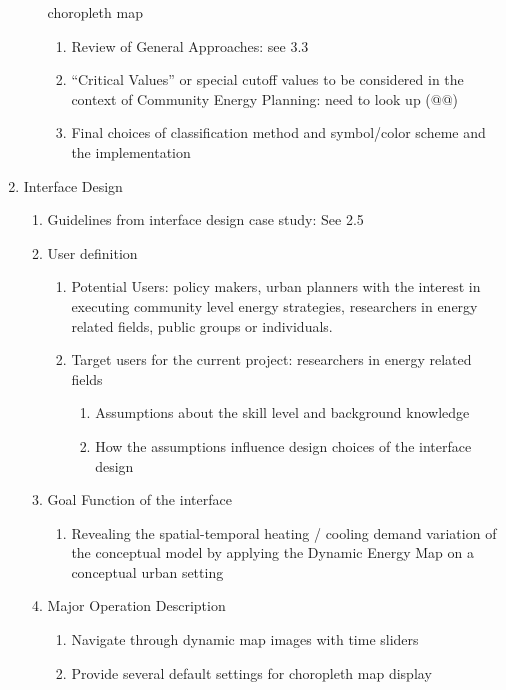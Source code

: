 \documentclass[12pt]{article}
\begin{document}
\begin{enumerate}
\begin{enumerate}[label*=\arabic*.]
    choropleth map
    \begin{enumerate}[label*=\arabic*.]
    \item Review of General Approaches: see 3.3
    \item ``Critical Values'' or special cutoff values to be
      considered in the context of Community Energy Planning: need to
      look up (@@)
    \item Final choices of classification method and symbol/color
      scheme and the implementation
    \end{enumerate}
  \end{enumerate}
\item Interface Design
  \begin{enumerate}[label*=\arabic*.]
  \item Guidelines from interface design case study: See 2.5
  \item User definition
    \begin{enumerate}[label*=\arabic*.]
    \item Potential Users: policy makers, urban planners with the
      interest in executing community level energy strategies,
      researchers in energy related fields, public groups or
      individuals.
    \item Target users for the current project: researchers in energy
      related fields
      \begin{enumerate}[label*=\arabic*.]
      \item Assumptions about the skill level and background knowledge
      \item How the assumptions influence design choices of the
        interface design
      \end{enumerate}
    \end{enumerate}
  \item Goal Function of the interface
    \begin{enumerate}[label*=\arabic*.]
    \item Revealing the spatial-temporal heating / cooling demand
      variation of the conceptual model by applying the Dynamic
      Energy Map on a conceptual urban setting
    \end{enumerate}
  \item Major Operation Description
    \begin{enumerate}[label*=\arabic*.]
    \item Navigate through dynamic map images with time sliders
    \item Provide several default settings for choropleth map display

\end{enumerate}
\end{enumerate}
\end{enumerate}
\end{document}

